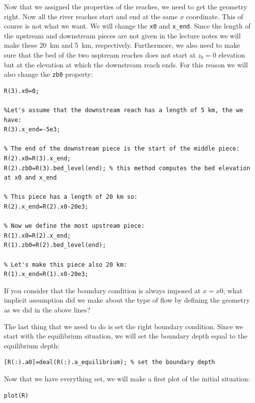 \documentclass[a4paper]{article}
\begin{document}
Now that we assigned the properties of the reaches, we need to get the geometry right. Now all the river reaches start and end at the same $x$ coordinate. This of course is not what we want. We will change the \lstinline{x0} and \lstinline{x_end}. Since the length of the upstream and downstream pieces are not given in the lecture notes we will make these \SI{20}{\km} and \SI{5}{\km}, respectively. Furthermore, we also need to make sure that the bed of the two usptream reaches does not start at $z_b=0$ elevation but at the elevation at which the downstream reach ends. For this reason we will also change the \lstinline{zb0} property:
\begin{lstlisting}
R(3).x0=0;

%Let's assume that the downstream reach has a length of 5 km, the we have:
R(3).x_end=-5e3;

% The end of the downstream piece is the start of the middle piece:
R(2).x0=R(3).x_end;
R(2).zb0=R(3).bed_level(end); % this method computes the bed elevation at x0 and x_end

% This piece has a length of 20 km so:
R(2).x_end=R(2).x0-20e3;

% Now we define the most upstream piece:
R(1).x0=R(2).x_end;
R(1).zb0=R(2).bed_level(end);

% Let's make this piece also 20 km:
R(1).x_end=R(1).x0-20e3;
\end{lstlisting}

\begin{exercise}
  If you consider that the boundary condition is always imposed at $x=x0$, what implicit assumption did we make about the type of flow by defining the geometry as we did in the above lines?
\end{exercise}

The last thing that we need to do is set the right boundary condition. Since we start with the equilibrium situation, we will set the boundary depth equal to the equilibrium depth:

\begin{lstlisting}
[R(:).a0]=deal(R(:).a_equilibrium); % set the boundary depth
\end{lstlisting}

Now that we have everything set, we will make a first plot of the initial situation:
\begin{lstlisting}
plot(R)
\end{lstlisting}
\end{document}
